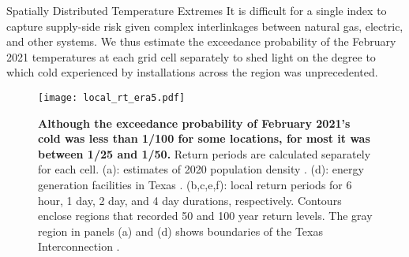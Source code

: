 \begin{block}{Spatially Distributed Temperature Extremes}
    It is difficult for a single index to capture supply-side risk given complex interlinkages between natural gas, electric, and other systems.
    We thus estimate the exceedance probability of the February 2021 temperatures at each grid cell separately to shed light on the degree to which cold experienced by installations across the region was unprecedented.
    \begin{framed}
        \begin{figure}
            \centering
            \texttt{[image: local\_rt\_era5.pdf]}
            \caption{
                \textbf{Although the exceedance probability of February 2021's cold was less than 1/100 for some locations, for most it was between 1/25 and 1/50.}
                Return periods are calculated separately for each cell.
                (a): estimates of 2020 population density \cite{ciesin_gpwv4:2016}.
                (d): energy generation facilities in Texas \cite{useia_generators:2021}.
                (b,c,e,f): local return periods for 6 hour, 1 day, 2 day, and 4 day durations, respectively.
                Contours enclose regions that recorded 50 and 100 year return levels.
                The gray region in panels (a) and (d) shows boundaries of the Texas Interconnection \cite{useia_regions:2021}.
            }\label{fig:local_era5}
        \end{figure}
    \end{framed}
\end{block}